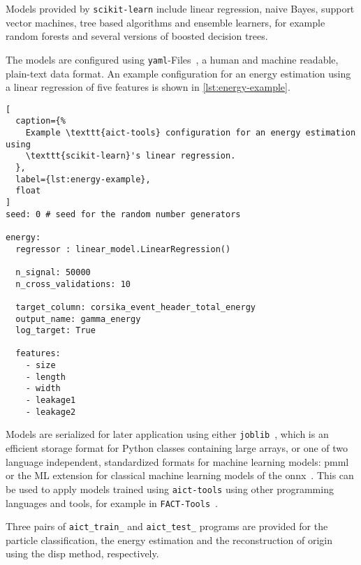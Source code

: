 Models provided by \texttt{scikit-learn} include linear regression, 
naive Bayes, support vector machines, tree based algorithms and ensemble 
learners, for example random forests and several versions of boosted decision trees.

The models are configured using \texttt{yaml}-Files~\cite{yaml}, a human and 
machine readable, plain-text data format. 
An example configuration for an energy estimation using a linear regression
of five features is shown in \autoref{lst:energy-example}.

\begin{lstlisting}[
  caption={%
    Example \texttt{aict-tools} configuration for an energy estimation using
    \texttt{scikit-learn}'s linear regression.
  },
  label={lst:energy-example},
  float
]
seed: 0 # seed for the random number generators

energy:
  regressor : linear_model.LinearRegression()

  n_signal: 50000
  n_cross_validations: 10

  target_column: corsika_event_header_total_energy
  output_name: gamma_energy
  log_target: True

  features:
    - size
    - length
    - width
    - leakage1
    - leakage2
\end{lstlisting}

Models are serialized for later application using either \texttt{joblib}~\cite{joblib},
which is an efficient storage format for Python classes containing large arrays, or
one of two language independent, standardized formats for machine learning models:
\gls{pmml}~\cite{pmml} or the ML extension for classical machine learning models of the \gls{onnx}~\cite{onnx}.
This can be used to apply models trained using \texttt{aict-tools} using 
other programming languages and tools, for example in \texttt{FACT-Tools}~\cite{streaming_adass}.

Three pairs of \texttt{aict\_train\_} and \texttt{aict\_test\_} programs are 
provided for the particle classification, the energy estimation and the
reconstruction of origin using the disp method, respectively.

